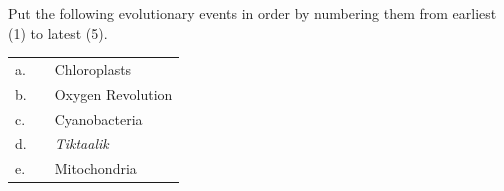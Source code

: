 \question[5]
Put the following evolutionary events in order by numbering them from earliest (1) to latest (5).
\vspace*{0.5\baselineskip}

\begin{tabular}{@{}L{0.35cm}R{1.1cm}l@{}}
a.  &     &   Chloroplasts \\[0.75em]

b.  &     &   Oxygen Revolution \\[0.75em]

c.  &     &   Cyanobacteria \\[0.75em]

d.  &     &   \textit{Tiktaalik} \\[0.75em]

e.  &     &   Mitochondria \\

\end{tabular}

